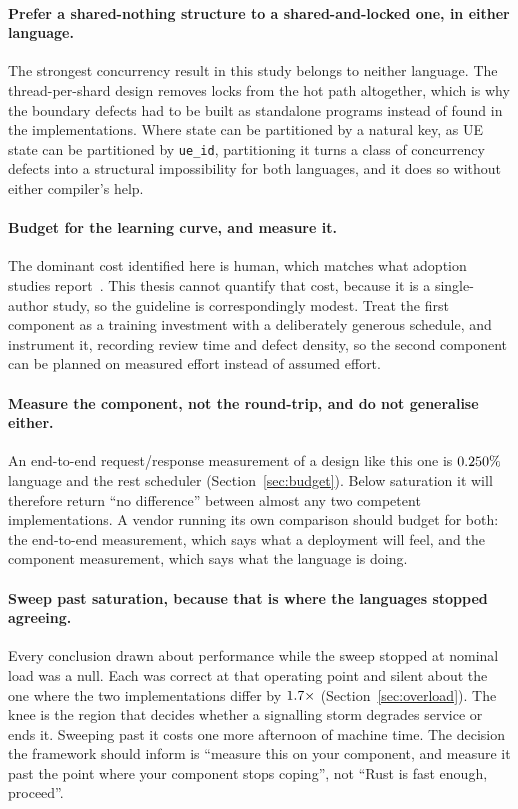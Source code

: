 \documentclass[english,oneside,a4paper,censored,csm,software-track-2020]{HYthesisML}
\begin{document}
\begin{appendices}
\paragraph{Prefer a shared-nothing structure to a shared-and-locked one, in either language.}
The strongest concurrency result in this study belongs to neither language. The
thread-per-shard design removes locks from the hot path altogether, which is why the boundary
defects had to be built as standalone programs instead of found in the implementations. Where
state can be partitioned by a natural key, as UE state can be partitioned by \texttt{ue\_id},
partitioning it turns a class of concurrency defects into a structural impossibility for both
languages, and it does so without either compiler's help.

\paragraph{Budget for the learning curve, and measure it.}
The dominant cost identified here is human, which matches what adoption studies
report~\cite{fulton2021adopting}. This thesis cannot quantify that cost, because it is a
single-author study, so the guideline is correspondingly modest. Treat the first component as a
training investment with a deliberately generous schedule, and instrument it, recording review
time and defect density, so the second component can be planned on measured effort instead of
assumed effort.

\paragraph{Measure the component, not the round-trip, and do not generalise either.}
An end-to-end request/response measurement of a design like this one is
$0.250\%$ language and the rest scheduler (Section~\ref{sec:budget}). Below
saturation it will therefore return ``no difference'' between almost any two competent
implementations. A vendor running its own comparison should budget for both: the end-to-end
measurement, which says what a deployment will feel, and the component measurement, which says
what the language is doing.

\paragraph{Sweep past saturation, because that is where the languages stopped agreeing.}
Every conclusion drawn about performance while the sweep stopped at nominal load was a null.
Each was correct at that operating point and silent about the one where the two implementations
differ by $1.7\times$ (Section~\ref{sec:overload}). The knee is the region that
decides whether a signalling storm degrades service or ends it. Sweeping past it costs one more
afternoon of machine time. The decision the framework should inform is ``measure this on your
component, and measure it past the point where your component stops coping'', not ``Rust is fast
enough, proceed''.

\end{appendices}

\clearpage
\end{document}
